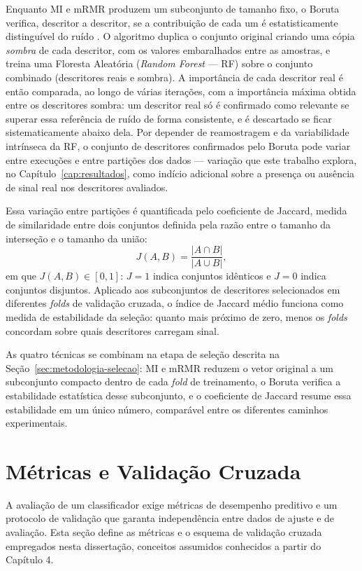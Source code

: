 Enquanto MI e mRMR produzem um subconjunto de tamanho fixo, o Boruta verifica, descritor a descritor, se a contribuição de cada um é estatisticamente distinguível do ruído \cite{kursa_boruta_2010}. O algoritmo duplica o conjunto original criando uma cópia \emph{sombra} de cada descritor, com os valores embaralhados entre as amostras, e treina uma Floresta Aleatória (\emph{Random Forest} --- RF) sobre o conjunto combinado (descritores reais e sombra). A importância de cada descritor real é então comparada, ao longo de várias iterações, com a importância máxima obtida entre os descritores sombra: um descritor real só é confirmado como relevante se superar essa referência de ruído de forma consistente, e é descartado se ficar sistematicamente abaixo dela. Por depender de reamostragem e da variabilidade intrínseca da RF, o conjunto de descritores confirmados pelo Boruta pode variar entre execuções e entre partições dos dados --- variação que este trabalho explora, no Capítulo~\ref{cap:resultados}, como indício adicional sobre a presença ou ausência de sinal real nos descritores avaliados.

Essa variação entre partições é quantificada pelo coeficiente de Jaccard, medida de similaridade entre dois conjuntos definida pela razão entre o tamanho da interseção e o tamanho da união:
\begin{equation}
J(A,B) = \frac{|A \cap B|}{|A \cup B|},
\end{equation}
em que $J(A,B) \in [0,1]$: $J=1$ indica conjuntos idênticos e $J=0$ indica conjuntos disjuntos. Aplicado aos subconjuntos de descritores selecionados em diferentes \emph{folds} de validação cruzada, o índice de Jaccard médio funciona como medida de estabilidade da seleção: quanto mais próximo de zero, menos os \emph{folds} concordam sobre quais descritores carregam sinal.

As quatro técnicas se combinam na etapa de seleção descrita na Seção~\ref{sec:metodologia-selecao}: MI e mRMR reduzem o vetor original a um subconjunto compacto dentro de cada \emph{fold} de treinamento, o Boruta verifica a estabilidade estatística desse subconjunto, e o coeficiente de Jaccard resume essa estabilidade em um único número, comparável entre os diferentes caminhos experimentais.

\section{Métricas e Validação Cruzada}

A avaliação de um classificador exige métricas de desempenho preditivo e um protocolo de validação que garanta independência entre dados de ajuste e de avaliação. Esta seção define as métricas e o esquema de validação cruzada empregados nesta dissertação, conceitos assumidos conhecidos a partir do Capítulo 4.

